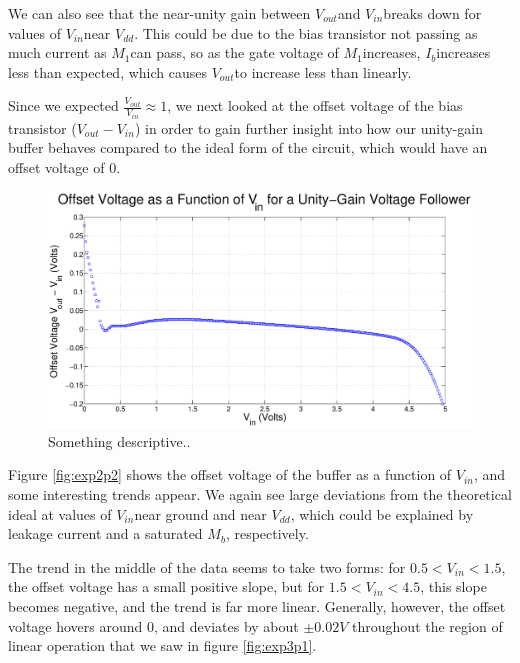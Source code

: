 \documentclass{article}
\newcommand{\Vout}{{$V_{out}$}}
\newcommand{\Vdd}{{$V_{dd}$}}
\newcommand{\Vin}{{$V_{in}$}}
\newcommand{\Ib}{{$I_{b}$}}
\newcommand{\Mone}{{$M_{1}$}}
\newcommand{\Mb}{{$M_{b}$}}
\begin{document}
We can also see that the near-unity gain between \Vout and \Vin breaks down for values of \Vin near \Vdd. This could be due to the bias transistor not passing as much current as \Mone can pass, so as the gate voltage of \Mone increases, \Ib increases less than expected, which causes \Vout to increase less than linearly.

Since we expected $\frac{V_{out}}{V_{in}} \approx 1$, we next looked at the offset voltage of the bias transistor ($V_{out} - V_{in}$) in order to gain further insight into how our unity-gain buffer behaves compared to the ideal form of the circuit, which would have an offset voltage of 0.

\begin{figure}[H]
\centering
\includegraphics[width=\linewidth]{../Figures/Exp3P2.eps}
\caption{Something descriptive..}
\label{fig:exp3p2}
\end{figure}

Figure \ref{fig:exp2p2} shows the offset voltage of the buffer as a function of \Vin, and some interesting trends appear. We again see large deviations from the theoretical ideal at values of \Vin near ground and near \Vdd, which could be explained by leakage current and a saturated \Mb, respectively.

The trend in the middle of the data seems to take two forms: for $0.5 < V_{in} < 1.5$, the offset voltage has a small positive slope, but for $1.5 < V_{in} < 4.5$, this slope becomes negative, and the trend is far more linear. Generally, however, the offset voltage hovers around 0, and deviates by about $\pm 0.02 V$ throughout the region of linear operation that we saw in figure \ref{fig:exp3p1}. 
\end{document}
